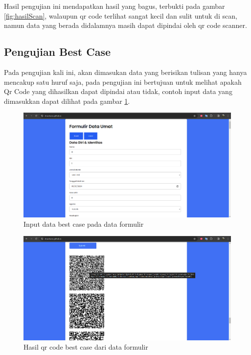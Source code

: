 Hasil pengujian ini mendapatkan hasil yang bagus, terbukti pada gambar \ref{fig:hasilScan}, walaupun qr code terlihat sangat kecil dan sulit untuk di scan, namun data yang berada didalamnya masih dapat dipindai oleh qr code scanner.

\subsection{Pengujian Best Case}
\label{sec:pengujianBest}

Pada pengujian kali ini, akan dimasukan data yang berisikan tulisan yang hanya mencakup satu huruf saja, pada pengujian ini bertujuan untuk melihat apakah Qr Code yang dihasilkan dapat dipindai atau tidak, contoh input data yang dimasukkan dapat dilihat pada gambar \ref{fig:inputBestCase}.

\begin{figure}[H]
	\centering
	\includegraphics[scale=0.4]{Gambar/inputBestCase.png}
	\caption{Input data best case pada data formulir} 
	\label{fig:inputBestCase}
\end{figure}

\begin{figure}[H]
	\centering
	\includegraphics[scale=0.4]{Gambar/qrCodeBestCase.png}
	\caption{Hasil qr code best case dari data formulir} 
	\label{fig:qrCodeBestCase}
\end{figure}

